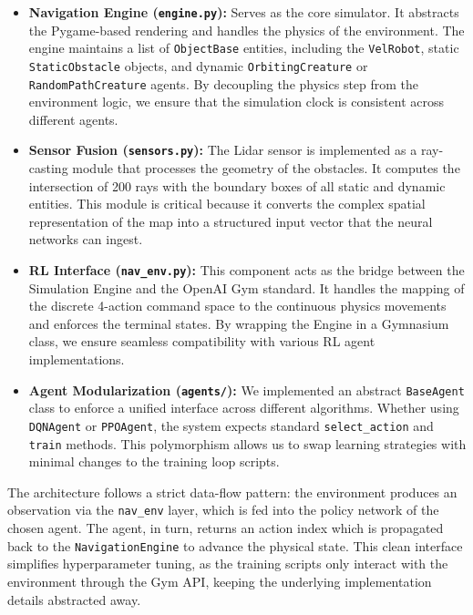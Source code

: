 \documentclass{article}
\begin{document}
\begin{itemize}
    \item \textbf{Navigation Engine (\texttt{engine.py}):} Serves as the core simulator. It abstracts the Pygame-based rendering and handles the physics of the environment. The engine maintains a list of \texttt{ObjectBase} entities, including the \texttt{VelRobot}, static \texttt{StaticObstacle} objects, and dynamic \texttt{OrbitingCreature} or \texttt{RandomPathCreature} agents. By decoupling the physics step from the environment logic, we ensure that the simulation clock is consistent across different agents.
    
    \item \textbf{Sensor Fusion (\texttt{sensors.py}):} The Lidar sensor is implemented as a ray-casting module that processes the geometry of the obstacles. It computes the intersection of 200 rays with the boundary boxes of all static and dynamic entities. This module is critical because it converts the complex spatial representation of the map into a structured input vector that the neural networks can ingest.
    
    \item \textbf{RL Interface (\texttt{nav\_env.py}):} This component acts as the bridge between the Simulation Engine and the OpenAI Gym standard. It handles the mapping of the discrete 4-action command space to the continuous physics movements and enforces the terminal states. By wrapping the Engine in a Gymnasium class, we ensure seamless compatibility with various RL agent implementations.
    
    \item \textbf{Agent Modularization (\texttt{agents/}):} We implemented an abstract \texttt{BaseAgent} class to enforce a unified interface across different algorithms. Whether using \texttt{DQNAgent} or \texttt{PPOAgent}, the system expects standard \texttt{select\_action} and \texttt{train} methods. This polymorphism allows us to swap learning strategies with minimal changes to the training loop scripts.
\end{itemize}

The architecture follows a strict data-flow pattern: the environment produces an observation via the \texttt{nav\_env} layer, which is fed into the policy network of the chosen agent. The agent, in turn, returns an action index which is propagated back to the \texttt{NavigationEngine} to advance the physical state. This clean interface simplifies hyperparameter tuning, as the training scripts only interact with the environment through the Gym API, keeping the underlying implementation details abstracted away.
\end{document}
